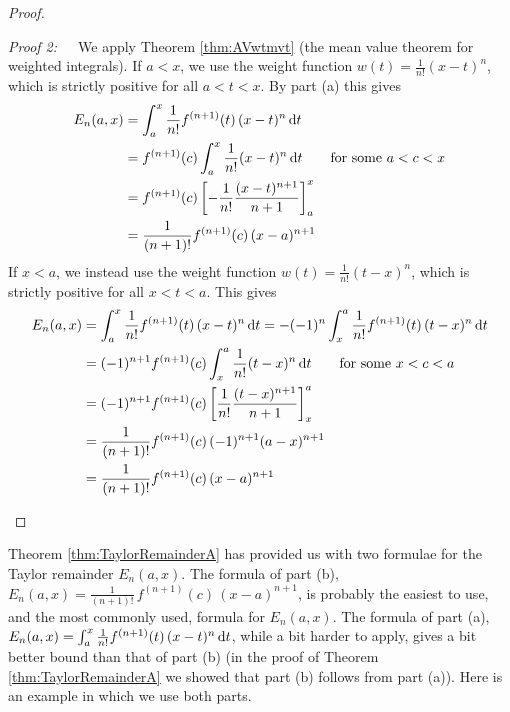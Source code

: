 \begin{proof}
\begin{enumerate}[(a)]
\emph{Proof 2:}\ \ \ We apply Theorem \ref{thm:AVwtmvt} (the mean value theorem for weighted integrals). If $a<x$,  we use the weight function 
$w(t) = \frac{1}{n!} (x-t)^n$, which is strictly positive for all $a<t<x$.
By part (a) this gives
\begin{align*}
E_n(a,x) &=\int_a^x \frac{1}{n!}f^{(n+1)}(t)\, (x-t)^n\,\mathrm{d}t \\
    &= f^{(n+1)}(c) \int_a^x \frac{1}{n!} (x-t)^n\,\mathrm{d}t \qquad
          \text{for some } a< c< x\\
    &= f^{(n+1)}(c) \left[-\frac{1}{n!}\frac{(x-t)^{n+1}}{n+1}\right]_a^x \\
    &= \frac{1}{(n+1)!}f^{(n+1)}(c)\, (x-a)^{n+1}
\end{align*}
 If $x < a$,  we instead use the weight function 
$w(t) = \frac{1}{n!} (t-x)^n$, which is strictly positive for all $x<t<a$.
This gives
\begin{align*}
E_n(a,x) &=\int_a^x \frac{1}{n!}f^{(n+1)}(t)\, (x-t)^n\,\mathrm{d}t 
      =-(-1)^n\int^a_x \frac{1}{n!}f^{(n+1)}(t)\, (t-x)^n\,\mathrm{d}t  \\
    &=(-1)^{n+1} f^{(n+1)}(c) \int_x^a \frac{1}{n!} (t-x)^n\,\mathrm{d}t \qquad
          \text{for some } x< c< a \\
    &= (-1)^{n+1} f^{(n+1)}(c) 
             \left[\frac{1}{n!}\frac{(t-x)^{n+1}}{n+1}\right]_x^a \\
    &= \frac{1}{(n+1)!}f^{(n+1)}(c)\, (-1)^{n+1} (a-x)^{n+1}  \\
    &= \frac{1}{(n+1)!}f^{(n+1)}(c)\, (x-a)^{n+1} 
\end{align*}
\end{enumerate}
\end{proof}
Theorem \ref{thm:TaylorRemainderA} has provided us with two formulae for
the Taylor remainder $E_n(a,x)$. The formula of part (b),
$E_n(a,x)=\frac{1}{(n+1)!}\,f^{(n+1)}(c)\, (x-a)^{n+1}$, is probably the 
easiest to use, and the most commonly used, formula for $E_n(a,x)$.
The formula of part (a), 
$E_n(a,x)=\int_a^x \frac{1}{n!}f^{(n+1)}(t)\, (x-t)^n\,\mathrm{d}t$, while a 
bit harder to apply, gives a bit better bound than that of part (b) 
(in the proof of Theorem \ref{thm:TaylorRemainderA} we showed that part (b) 
follows from part (a)). Here is an example in which we use both parts. 

